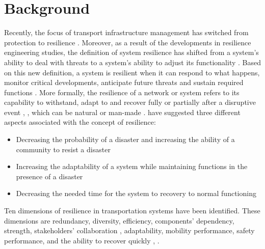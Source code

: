 \documentclass[11pt,twoside]{article}
\numberwithin{equation}{section}
\newcommand{\?}{\stackrel{?}{=}}
\begin{document}
\section{Background}

Recently, the focus of transport infrastructure management has switched from protection to resilience \citep{das2020approach}. Moreover, as a result of the developments in resilience engineering studies, the definition of system resilience has shifted from a system's ability to deal with threats to a system's ability to adjust its functionality \citep{hollnagel2010resilience}.  Based on this new definition, a system is resilient when it can respond to what happens, monitor critical developments, anticipate future threats and sustain required functions \citep{hollnagel2010resilience}. More formally, the resilience of a network or system refers to its capability to withstand, adapt to and recover fully or partially after a disruptive event \citep{aydin2018framework}, \citep{almoghathawi2019component}, which can be natural or man-made \citep{ahmed2020resilience}.
\citet{weilant2019incorporating} have suggested three different aspects associated with the concept of resilience:
\begin{itemize}
  \item Decreasing the probability of a disaster and increasing the ability of a community to resist a disaster
  \item Increasing the adaptability of a system while maintaining functions in the presence of a disaster
  \item Decreasing the needed time for the system to recovery
to normal functioning
\end{itemize}
Ten dimensions of resilience in transportation systems have been identified. These dimensions are redundancy, diversity,
efficiency, components' dependency, strength, stakeholders' collaboration \citep{ahmed2020resilience}, adaptability, mobility performance, safety performance, and the ability to recover quickly \citep{ahmed2020resilience}, \citep{murray-tuite2006comparison}.
\end{document}
